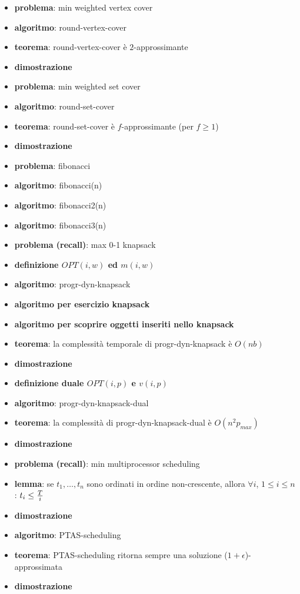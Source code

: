     \begin{itemize}

\item
  \textbf{problema}: min weighted vertex cover
\item
  \textbf{algoritmo}: round-vertex-cover
\item
  \textbf{teorema}: round-vertex-cover è \(2\)-approssimante
\item
  \textbf{dimostrazione}
\item
  \textbf{problema}: min weighted set cover
\item
  \textbf{algoritmo}: round-set-cover
\item
  \textbf{teorema}: round-set-cover è \(f\)-approssimante (per
  \(f \geq 1\))
\item
  \textbf{dimostrazione}
\end{itemize}

    \begin{itemize}

\item
  \textbf{problema}: fibonacci
\item
  \textbf{algoritmo}: fibonacci(n)
\item
  \textbf{algoritmo}: fibonacci2(n)
\item
  \textbf{algoritmo}: fibonacci3(n)
\item
  \textbf{problema (recall)}: max 0-1 knapsack
\item
  \textbf{definizione \(OPT(i,w)\) ed \(m(i,w)\)}
\item
  \textbf{algoritmo}: progr-dyn-knapsack
\item
  \textbf{algoritmo per esercizio knapsack}
\item
  \textbf{algoritmo per scoprire oggetti inseriti nello knapsack}
\item
  \textbf{teorema}: la complessità temporale di progr-dyn-knapsack è
  \(O(nb)\)
\item
  \textbf{dimostrazione}
\item
  \textbf{definizione duale \(OPT(i,p)\) e \(v(i,p)\)}
\item
  \textbf{algoritmo}: progr-dyn-knapsack-dual
\item
  \textbf{teorema}: la complessità di progr-dyn-knapsack-dual è
  \(O(n^2p_{max})\)
\item
  \textbf{dimostrazione}
\end{itemize}

    \begin{itemize}

\item
  \textbf{problema (recall)}: min multiprocessor scheduling
\item
  \textbf{lemma}: se \(t_1,\dots,t_n\) sono ordinati in ordine
  non-crescente, allora \(\forall i\), \(1 \leq i \leq n\):
  \(t_i \leq {T \over i}\)
\item
  \textbf{dimostrazione}
\item
  \textbf{algoritmo}: PTAS-scheduling
\item
  \textbf{teorema}: PTAS-scheduling ritorna sempre una soluzione
  (\(1+\epsilon\))-approssimata
\item
  \textbf{dimostrazione}
\end{itemize}

